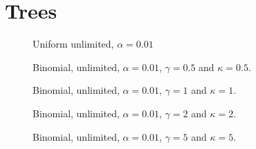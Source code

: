 \newpage
\chapter{Trees}
%
%
%
%
%

\begin{figure}
    \centering
    \scalebox{0.5}{}
    \caption{Uniform unlimited, $\alpha = 0.01$}
    \label{unif_unlim_a0.01}
\end{figure}

\begin{figure}
    \centering
    \begin{minipage}[t]{0.45\textwidth} 
        \centering
        \scalebox{0.6}{}
        \caption{Binomial, unlimited, $\alpha = 0.01$, $\gamma=0.5$ and $\kappa=0.5$.}
        \label{binom_unlim_a0.01_g0.5_k0.5}
    \end{minipage}
    \hfill
    \centering
    \begin{minipage}[t]{0.45\textwidth} 
        \centering
        \scalebox{0.6}{}
        \caption{Binomial, unlimited, $\alpha = 0.01$, $\gamma=1$ and $\kappa=1$.}
        \label{binom_unlim_a0.01_g1_k1}
    \end{minipage}
\end{figure}

\begin{figure}
    \centering
    \begin{minipage}[t]{0.45\textwidth} 
        \centering
        \scalebox{0.6}{}
        \caption{Binomial, unlimited, $\alpha = 0.01$, $\gamma=2$ and $\kappa=2$.}
        \label{binom_unlim_a0.01_g2_k2}
    \end{minipage}
    \hfill
    \centering
    \begin{minipage}[t]{0.45\textwidth} 
        \centering
        \scalebox{0.6}{}
        \caption{Binomial, unlimited, $\alpha = 0.01$, $\gamma=5$ and $\kappa=5$.}
        \label{binom_unlim_a0.01_g5_k5}
    \end{minipage}
\end{figure}


